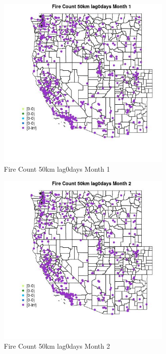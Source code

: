 \begin{figure} 
\centering  
\includegraphics[width=0.77\textwidth]{Code_Outputs/Report_ML_input_PM25_Step4_part_e_de_duplicated_aves_compiled_2019-05-18wNAs_MapObsMo1Fire_Count_50km_lag0days.jpg} 
\caption{\label{fig:Report_ML_input_PM25_Step4_part_e_de_duplicated_aves_compiled_2019-05-18wNAsMapObsMo1Fire_Count_50km_lag0days}Fire Count 50km lag0days Month 1} 
\end{figure} 
 

\begin{figure} 
\centering  
\includegraphics[width=0.77\textwidth]{Code_Outputs/Report_ML_input_PM25_Step4_part_e_de_duplicated_aves_compiled_2019-05-18wNAs_MapObsMo2Fire_Count_50km_lag0days.jpg} 
\caption{\label{fig:Report_ML_input_PM25_Step4_part_e_de_duplicated_aves_compiled_2019-05-18wNAsMapObsMo2Fire_Count_50km_lag0days}Fire Count 50km lag0days Month 2} 
\end{figure} 
 


